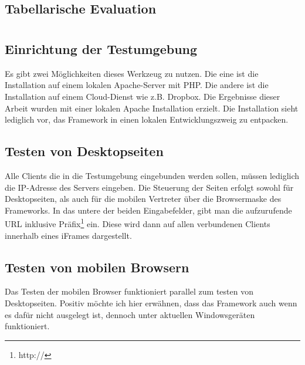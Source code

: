 	\subsection{Tabellarische Evaluation}


	\pagebreak			
	\section{}
		\subsection {Einrichtung der Testumgebung}
		Es gibt zwei Möglichkeiten dieses Werkzeug zu nutzen. Die eine ist die Installation auf einem lokalen Apache-Server mit 			PHP. Die andere ist die Installation auf einem Cloud-Dienst wie z.B. Dropbox. Die Ergebnisse dieser Arbeit wurden mit einer 		lokalen Apache Installation erzielt. Die Installation sieht lediglich vor, das Framework in einen lokalen Entwicklungszweig zu 		entpacken.
		
		\subsection{Testen von Desktopseiten}
		Alle Clients die in die Testumgebung eingebunden werden sollen, müssen lediglich die IP-Adresse des Servers eingeben.
		Die Steuerung der Seiten erfolgt sowohl für Desktopseiten, als auch für die mobilen Vertreter über die Browsermaske des 			Frameworks. In das untere der beiden Eingabefelder, gibt man die aufzurufende URL inklusive Präfix\footnote{http://} ein. 			Diese wird dann auf allen verbundenen Clients innerhalb eines iFrames dargestellt. 
				
		 \subsection{Testen von mobilen Browsern}
		 Das Testen der mobilen Browser funktioniert parallel zum testen von Desktopseiten. Positiv möchte ich hier erwähnen, 			dass das Framework auch wenn es dafür nicht ausgelegt ist, dennoch unter aktuellen Windowsgeräten funktioniert.			
		
